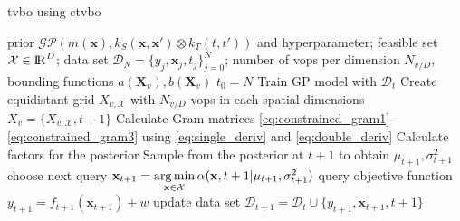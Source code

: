 \begin{algorithm}[h]
\centering
\caption{\gls{tvbo} using \gls{ctvbo}}
\begin{algorithmic}[1]
\Require prior $\mathcal{GP}(m(\mathbf{x}), k_S(\mathbf{x},\mathbf{x}') \otimes k_T(t, t'))$ and hyperparameter; feasible set ${\mathcal{X}\in \mathrm{I\!R}^D}$; data set $\mathcal{D}_{N} = \{y_j, \mathbf{x}_j, t_j\}_{j=0}^{N}$; number of \glspl{vop} per dimension $N_{v/D}$, bounding functions $a(\mathbf{X}_v), b(\mathbf{X}_v)$
\State $t_0=N$
    \State Train GP model with $\mathcal{D}_t$
    \vspace{2pt}
    \State Create equidistant grid $X_{v,\mathcal{X}}$ with $N_{v/D}$ \glspl{vop} in each spatial dimensions
    \State $X_v = \{X_{v,\mathcal{X}}, t+1\}$
    \vspace{5pt}
    \vspace{2pt}
    \State Calculate Gram matrices \eqref{eq:constrained_gram1}--\eqref{eq:constrained_gram3} using \eqref{eq:single_deriv} and \eqref{eq:double_deriv}
    \State Calculate factors for the posterior 
    \State Sample from the posterior at $t+1$ to obtain $\mu_{t+1}, \sigma^2_{t+1}$ 
    \vspace{2pt}
    \State choose next query $\mathbf{x}_{t+1} = \underset{\mathbf{x}\in \mathcal{X}}{\arg\min} \,\alpha(\mathbf{x}, t+1|\mu_{t+1}, \sigma^2_{t+1})$
    \State query objective function $y_{t+1} = f_{t+1}(\mathbf{x}_{t+1}) + w$
    \State update data set $\mathcal{D}_{t+1} = \mathcal{D}_{t} \cup \{y_{t+1}, \mathbf{x}_{t+1}, t+1\}$
\EndFor
\end{algorithmic}
\label{algo:constrained_tvbo}
\end{algorithm}

